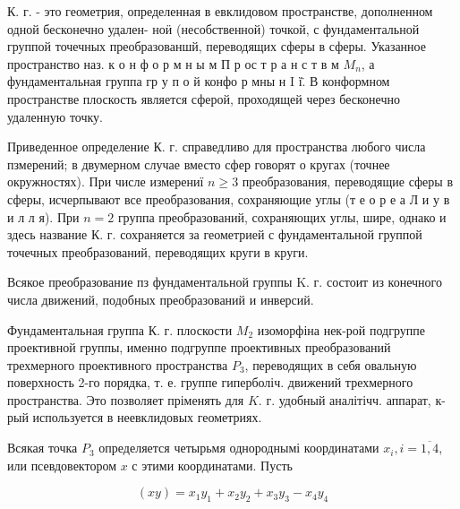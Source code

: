 \documentclass[10pt]{article}
\begin{document}
К. г. - это геометрия, определенная в евклидовом пространстве, дополненном одной бесконечно удален- ноӥ (несобственной) точкой, с фундаментальной группой точечных преобразованшй, переводящих сферы в сферы. Указанное пространство наз. к о н ф о р м н ы м П р ос т р а н с т в м $M_{n}$, а фундаментальная группа гр у п о й конфо р мны н I ї̈. В конформном пространстве плоскость является сферой, проходящей через бесконечно удаленную точку.



Приведенное определение К. г. справедливо для пространства любого числа пзмерений; в двумерном случае вместо сфер говорят о кругах (точнее окружностях). При числе измерениї $n \geqslant 3$ преобразования, переводящие сферы в сферы, исчерпывают все преобразования, сохраняющие углы (т е о р е а Л и у в и л л я). При $n=2$ группа преобразований, сохраняющих углы, шире, однако и здесь название К. г. сохраняется за геометрией с фундаментальной группой точечных преобразований, переводящих круги в круги.



Всякое преобразование пз фундаментальной группы K. г. состоит из конечного числа движений, подобных преобразований и инверсий.



Фундаментальная группа К. г. плоскости $M_{2}$ изоморфіна нек-рой подгруппе проективной группы, именно подгруппе проективных преобразований трехмерного проективного пространства $P_{3}$, переводящих в себя овальную поверхность 2-го порядка, т. е. группе гиперболіч. движений трехмерного пространства. Это позволяет пріменять для $K$. г. удобный аналітічч. аппарат, к-рый используется в неевклидовых геометриях.



Всякая точка $P_{3}$ определяется четырьмя однороднымі координатами $x_{i}, i=\overline{1,4}$, или псевдовектором $x$ с этими координатами. Пусть



\[

(x y)=x_{1} y_{1}+x_{2} y_{2}+x_{3} y_{3}-x_{4} y_{4}

\]
\end{document}
